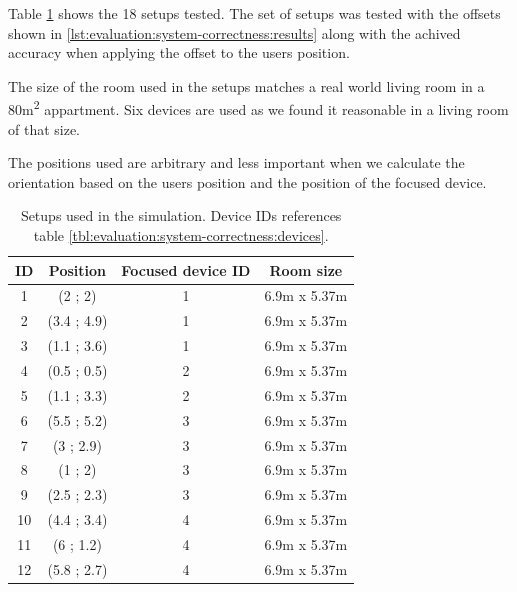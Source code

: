 Table \ref{lst:evaluation:system-correctness:setups} shows the 18 setups tested. The set of setups was tested with the offsets shown in \ref{lst:evaluation:system-correctness:results} along with the achived accuracy when applying the offset to the users position.

The size of the room used in the setups matches a real world living room in a 80m\textsuperscript{2} appartment. Six devices are used as we found it reasonable in a living room of that size.

The positions used are arbitrary and less important when we calculate the orientation based on the users position and the position of the focused device.

\begin{table}[!hbt]
\centering
\caption{Setups used in the simulation. Device IDs references table \ref{tbl:evaluation:system-correctness:devices}.}
\label{lst:evaluation:system-correctness:setups}
\begin{tabular}{c|ccc}
\textbf{ID} & \textbf{Position} & \textbf{Focused device ID} & \textbf{Room size} \\
\hline
1           & (2 ; 2)           & 1                          & 6.9m x 5.37m       \\
2           & (3.4 ; 4.9)       & 1                          & 6.9m x 5.37m       \\
3           & (1.1 ; 3.6)       & 1                          & 6.9m x 5.37m       \\
4           & (0.5 ; 0.5)       & 2                          & 6.9m x 5.37m       \\
5           & (1.1 ; 3.3)       & 2                          & 6.9m x 5.37m       \\
6           & (5.5 ; 5.2)       & 3                          & 6.9m x 5.37m       \\
7           & (3 ; 2.9)         & 3                          & 6.9m x 5.37m       \\
8           & (1 ; 2)           & 3                          & 6.9m x 5.37m       \\
9           & (2.5 ; 2.3)       & 3                          & 6.9m x 5.37m       \\
10          & (4.4 ; 3.4)       & 4                          & 6.9m x 5.37m       \\
11          & (6 ; 1.2)         & 4                          & 6.9m x 5.37m       \\
12          & (5.8 ; 2.7)       & 4                          & 6.9m x 5.37m       \\

\end{tabular}
\end{table}
